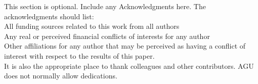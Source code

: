 \documentclass[draft]{agujournal2019}
\begin{document}
%

%



\acknowledgments
This section is optional. Include any Acknowledgments here.
The acknowledgments should list:\\
All funding sources related to this work from all authors\\
Any real or perceived financial conflicts of interests for any author\\
Other affiliations for any author that may be perceived as having a conflict of interest with respect to the results of this paper.\\
It is also the appropriate place to thank colleagues and other contributors. AGU does not normally allow dedications.



%
%


%

\end{document}
